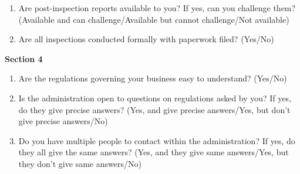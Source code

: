 \documentclass[a4paper, 12pt]{article}
\begin{document}
\begin{mdframed}[backgroundcolor=gray!20]
\begin{enumerate}[noitemsep]
\item Are post-inspection reports available to you? If yes, can you challenge them? (Available and can challenge/Available but cannot challenge/Not available)
\item Are all inspections conducted formally with paperwork filed? (Yes/No)
\end{enumerate}
\textbf {Section 4}
\begin{enumerate}[noitemsep]
\item Are the regulations governing your business easy to understand? (Yes/No)
\item Is the administration open to questions on regulations asked by you? If yes, do they give precise answers? (Yes, and give precise answers/Yes, but don’t give precise answers/No)
\item Do you have multiple people to contact within the administration? If yes, do they all give the same answers? (Yes, and they give same answers/Yes, but they don’t give same 
answers/No)
\end{enumerate} 
\end{mdframed}

\newpage
\end{document}
